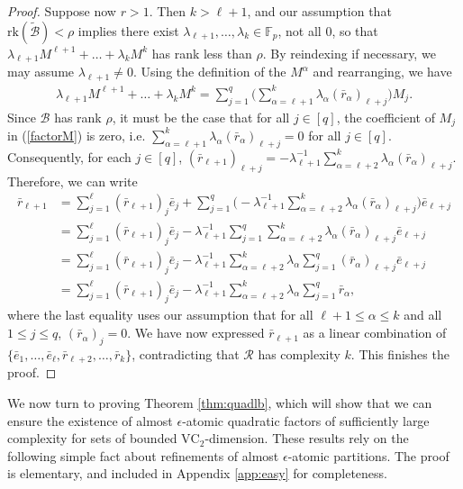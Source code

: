 \documentclass[12pt,oneside,british,a4wide]{amsart}
\numberwithin{equation}{section}
\theoremstyle{definition}
\def\F{\mathbb{F}}
\def\VC{\mathrm{VC}}
\def\e{\epsilon}
\newcommand{\ebar}{\bar{e}}
\newcommand{\rbar}{\bar{r}}
\newcommand{\calB}{\mathcal{B}}
\newcommand{\calR}{\mathcal{R}}
\newcommand{\rk}{{\mathrm{rk}}}
\begin{document}
\begin{proof}
Suppose now $r>1$. Then $k>\ell+1$, and our assumption that $\rk(\tilde{\calB})<\rho$ implies there exist $\lambda_{\ell+1},\ldots, \lambda_k\in \F_p$, not all $0$, so that $ \lambda_{\ell+1}M^{\ell+1}+\ldots+\lambda_kM^k$ has rank less than $\rho$.  By reindexing if necessary, we may assume $\lambda_{\ell+1}\neq 0$.  Using the definition of the $M^{\alpha}$ and rearranging, we have
\begin{align}\label{factorM}
\lambda_{\ell+1}M^{\ell+1}+\ldots+\lambda_kM^k=\sum_{j=1}^q\Big(\sum_{\alpha=\ell+1}^k\lambda_{\alpha}(\rbar_{\alpha})_{\ell+j} \Big)M_j.
\end{align}
Since $\calB$ has rank $\rho$, it must be the case that for all $j\in [q]$, the coefficient of $M_j$ in (\ref{factorM})  is zero, i.e. $\sum_{\alpha=\ell+1}^k\lambda_{\alpha} (\rbar_{\alpha})_{\ell+j}=0$ for all $j\in [q]$.   Consequently, for each $j\in [q]$, $(\rbar_{\ell+1})_{\ell+j}=-\lambda_{\ell+1}^{-1}\sum_{\alpha=\ell+2}^k \lambda_{\alpha}(\rbar_{\alpha})_{\ell+j}$. Therefore, we can write
\begin{align*}
\rbar_{\ell+1}&=\sum_{j=1}^{\ell}(\rbar_{\ell+1})_j\ebar_j+\sum_{j=1}^q\Big(-\lambda_{\ell+1}^{-1}\sum_{\alpha=\ell+2}^k \lambda_{\alpha}(\rbar_{\alpha})_{\ell+j}\Big)\ebar_{\ell+j}\\
&=\sum_{j=1}^{\ell}(\rbar_{\ell+1})_j\ebar_j-\lambda_{\ell+1}^{-1}\sum_{j=1}^q\sum_{\alpha=\ell+2}^k \lambda_{\alpha}(\rbar_{\alpha})_{\ell+j}\ebar_{\ell+j}\\
&=\sum_{j=1}^{\ell}(\rbar_{\ell+1})_j\ebar_j-\lambda_{\ell+1}^{-1} \sum_{\alpha=\ell+2}^k \lambda_{\alpha}\sum_{j=1}^q(\rbar_{\alpha})_{\ell+j}\ebar_{\ell+j}\\
&=\sum_{j=1}^{\ell}(\rbar_{\ell+1})_j\ebar_j-\lambda_{\ell+1}^{-1} \sum_{\alpha=\ell+2}^k \lambda_{\alpha}\sum_{j=1}^q \rbar_{\alpha}, 
\end{align*}
where the last equality uses our assumption that for all $\ell+1\leq \alpha\leq k$ and all $1\leq j\leq q$, $(\rbar_{\alpha})_j=0$.   We have now expressed $\rbar_{\ell+1}$ as a linear combination of $\{\ebar_1,\ldots, \ebar_{\ell},\rbar_{\ell+2},\ldots, \rbar_k\}$, contradicting that $\calR$ has complexity $k$.  This finishes the proof.
\end{proof}


We now turn to proving Theorem \ref{thm:quadlb}, which will show that we can ensure the existence of  almost $\e$-atomic quadratic factors of sufficiently large complexity for sets of bounded $\VC_2$-dimension.  These results rely on the following simple fact about refinements of almost $\e$-atomic partitions. The proof is elementary, and included in Appendix \ref{app:easy} for completeness. 
\end{document}
